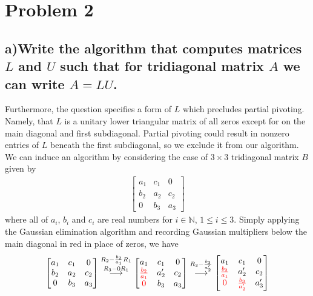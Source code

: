 \documentclass[11pt, letterpaper]{article}
\begin{document}
\section*{Problem 2}
\subsection*{a)\normalfont Write the algorithm that computes matrices $L$ and $U$ such that for tridiagonal matrix
$A$ we can write $A=LU$.}
Furthermore, the question specifies a form of $L$ which precludes partial pivoting. Namely, that $L$ is
a unitary lower triangular matrix of all zeros except for on the main diagonal and first subdiagonal. Partial 
pivoting could result in nonzero entries of $L$ beneath the first subdiagonal, so we exclude it from
our algorithm. We can induce an algorithm by considering the case of $3\times 3$ tridiagonal matrix $B$ given by
\begin{align*}
    \begin{bmatrix}
        a_1 & c_1 & 0\\
        b_2 & a_2 & c_2\\
        0 & b_3 & a_3
    \end{bmatrix}
\end{align*}
where all of $a_i$, $b_i$ and $c_i$ are real numbers for $i\in\mathbb{N}$, $1\leq i \leq 3$. Simply applying
the Gaussian elimination algorithm and recording Gaussian multipliers below the main diagonal in {\color{red}red}
in place of zeros, we have
\begin{align*}
    \begin{bmatrix}
        a_1 & c_1 & 0\\
        b_2 & a_2 & c_2\\
        0 & b_3 & a_3
    \end{bmatrix}
    \overset{R_2-\frac{b_2}{a_1}R_1}{\overset{R_3-0R_1}{\longrightarrow}}
    \begin{bmatrix}
        a_1 & c_1 & 0\\
        {\color{red}\frac{b_2}{a_1}} & a_2' & c_2\\
        {\color{red}0} & b_3 & a_3
    \end{bmatrix}
    \overset{R_3-\frac{b_3}{a_2'}}{\longrightarrow}
    \begin{bmatrix}
        a_1 & c_1 & 0\\
        {\color{red}\frac{b_2}{a_1}} & a_2' & c_2\\
        {\color{red}0} & {\color{red}\frac{b_3}{a_2'}} & a_3'
    \end{bmatrix}
\end{align*}
\end{document}
